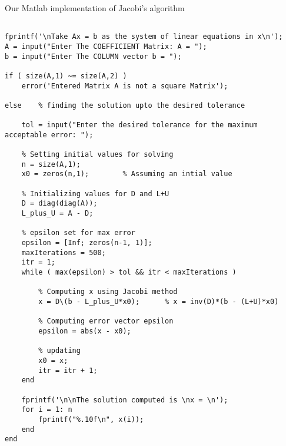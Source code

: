 \documentclass[main]{subfiles}
\begin{document}
Our Matlab implementation of Jacobi's algorithm\\

{\footnotesize
\begin{verbatim}    
    
fprintf('\nTake Ax = b as the system of linear equations in x\n');
A = input("Enter The COEFFICIENT Matrix: A = ");
b = input("Enter The COLUMN vector b = ");

if ( size(A,1) ~= size(A,2) ) 
    error('Entered Matrix A is not a square Matrix');

else    % finding the solution upto the desired tolerance 
    
    tol = input("Enter the desired tolerance for the maximum acceptable error: ");
    
    % Setting initial values for solving
    n = size(A,1);
    x0 = zeros(n,1);        % Assuming an intial value

    % Initializing values for D and L+U
    D = diag(diag(A));
    L_plus_U = A - D;  

    % epsilon set for max error
    epsilon = [Inf; zeros(n-1, 1)];
    maxIterations = 500;
    itr = 1;
    while ( max(epsilon) > tol && itr < maxIterations )

        % Computing x using Jacobi method
        x = D\(b - L_plus_U*x0);      % x = inv(D)*(b - (L+U)*x0)
        
        % Computing error vector epsilon
        epsilon = abs(x - x0);

        % updating
        x0 = x;
        itr = itr + 1;
    end

    fprintf('\n\nThe solution computed is \nx = \n');
    for i = 1: n
        fprintf("%.10f\n", x(i));
    end    
end
    \end{verbatim}
}

\clearpage
\end{document}
